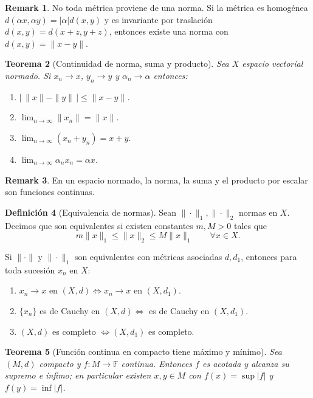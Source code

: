 \documentclass[11pt]{article}
\theoremstyle{definition}
\newtheorem{definition}{Definición}[section]
\newtheorem{remark}[definition]{Remark}
\theoremstyle{plain}
\newtheorem{theorem}[definition]{Teorema}
\begin{document}
\begin{remark}
No toda métrica proviene de una norma. Si la métrica es homogénea $d(\alpha x,\alpha y)=|\alpha|d(x,y)$ y es invariante por traslación $d(x,y)=d(x+z,y+z)$, entonces existe una norma con $d(x,y)=\|x-y\|$.
\end{remark}

\begin{theorem}[Continuidad de norma, suma y producto]
Sea $X$ espacio vectorial normado. Si $x_n\to x$, $y_n\to y$ y $\alpha_n\to\alpha$ entonces:
\begin{enumerate}[label=(\arabic*)]
\item $|\,\|x\|-\|y\|\,|\le\|x-y\|$.
\item $\lim_{n\to\infty}\|x_n\|=\|x\|$.
\item $\lim_{n\to\infty}(x_n+y_n)=x+y$.
\item $\lim_{n\to\infty}\alpha_n x_n=\alpha x$.
\end{enumerate}
\end{theorem}

\begin{remark}
En un espacio normado, la norma, la suma y el producto por escalar son funciones continuas.
\end{remark}

\begin{definition}[Equivalencia de normas]
Sean $\|\cdot\|_1,\|\cdot\|_2$ normas en $X$. Decimos que son equivalentes si existen constantes $m,M>0$ tales que
\[m\|x\|_1\le\|x\|_2\le M\|x\|_1\qquad\forall x\in X.
\]
\end{definition}

\begin{corollary}
Si $\|\cdot\|$ y $\|\cdot\|_1$ son equivalentes con métricas asociadas $d,d_1$, entonces para toda sucesión $x_n$ en $X$:
\begin{enumerate}[label=(\arabic*)]
\item $x_n\to x$ en $(X,d)\iff x_n\to x$ en $(X,d_1)$.
\item $\{x_n\}$ es de Cauchy en $(X,d)\iff$ es de Cauchy en $(X,d_1)$.
\item $(X,d)$ es completo $\iff (X,d_1)$ es completo.
\end{enumerate}
\end{corollary}

\begin{theorem}[Función continua en compacto tiene máximo y mínimo]
Sea $(M,d)$ compacto y $f:M\to\mathbb{F}$ continua. Entonces $f$ es acotada y alcanza su supremo e ínfimo; en particular existen $x,y\in M$ con $f(x)=\sup|f|$ y $f(y)=\inf|f|$.
\end{theorem}
\end{document}
